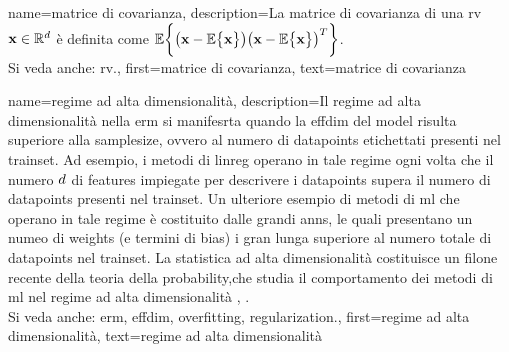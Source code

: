 	
	

{name={matrice di covarianza}, 
	description={La matrice di covarianza di una \gls{rv} ${\bf x} \in \mathbb{R}^{d}$ 
		è definita come $\mathbb{E} \bigg \{ \big( {\bf x} - \mathbb{E} \big\{ {\bf x} \big\} \big)  \big({\bf x} - \mathbb{E} \big\{ {\bf x} \big\} \big)^{T} \bigg\}$.
				\\
		Si veda anche: \gls{rv}.},
	first={matrice di covarianza},
	text={matrice di covarianza} 
}
	
{name={regime ad alta dimensionalità}, 
 description={Il 
		regime ad alta dimensionalità nella \gls{erm} si manifesrta quando la \gls{effdim} del \gls{model} 
		risulta superiore alla \gls{samplesize}, ovvero al numero di \glspl{datapoint} etichettati presenti nel \gls{trainset}. 
		Ad esempio, i  metodi di \gls{linreg} operano in tale regime ogni volta che il numero $d$ di \glspl{feature} 
		impiegate per descrivere i \glspl{datapoint} supera il numero di \glspl{datapoint} presenti nel \gls{trainset}. 
		Un ulteriore esempio di metodi di \gls{ml} che operano in tale regime è costituito dalle grandi \glspl{ann}, le quali  
		presentano un numeo di \gls{weights} (e termini di bias) i gran lunga superiore al numero totale di \glspl{datapoint} 
		nel \gls{trainset}. 
		La statistica ad alta dimensionalità costituisce un filone recente della teoria della \gls{probability},che studia il comportamento 
		dei metodi di  \gls{ml} nel regime ad alta dimensionalità \cite{Wain2019}, \cite{BuhlGeerBook}.
				\\
		Si veda anche: \gls{erm}, \gls{effdim}, \gls{overfitting}, \gls{regularization}.},
   first={regime ad alta dimensionalità},
   text={regime ad alta dimensionalità} 
}

